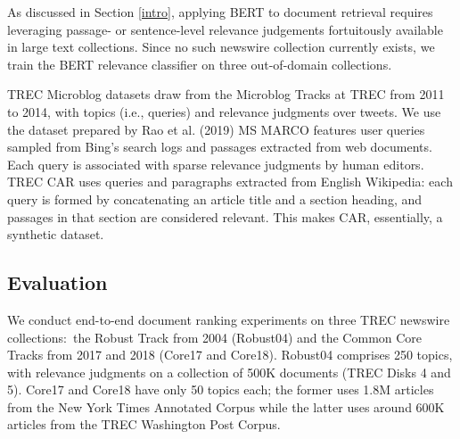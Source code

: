 %
%

As discussed in Section \ref{intro}, applying BERT to document retrieval requires leveraging passage- or sentence-level relevance judgements fortuitously available in large text collections.
Since no such newswire collection currently exists, we train the BERT relevance classifier on three out-of-domain collections.

TREC Microblog datasets draw from the Microblog Tracks at TREC from 2011 to 2014, with topics (i.e., queries) and relevance judgments over tweets. We use the dataset prepared by Rao et al. (2019)
MS MARCO features user queries sampled from Bing’s search logs and passages extracted from web documents. Each query is associated with sparse relevance judgments by human editors. TREC CAR uses queries and paragraphs extracted from English Wikipedia: each query is formed by concatenating an article title and a section heading, and passages in that section are considered relevant.
This makes CAR, essentially, a synthetic dataset.

\subsection{Evaluation}

%
%

We conduct end-to-end document ranking experiments on three TREC newswire collections:\
the Robust Track from 2004 (Robust04) and the Common Core Tracks from 2017 and 2018 (Core17 and Core18). Robust04 comprises 250 topics, with relevance judgments on a collection of 500K documents (TREC Disks 4 and 5).
Core17 and Core18 have only 50 topics each; the former uses 1.8M articles from the New York Times Annotated Corpus while the latter uses around 600K articles from the TREC Washington Post Corpus.